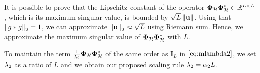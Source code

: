    It is possible to prove that the Lipschitz constant of the operator $\bm{\Phi}_\mathcal{H}\bm{\Phi}_\mathcal{H}^* \in \mathbb{R}^{L \times L}$, which is its maximum singular value, is bounded by $\sqrt{L} \left\lVert\mathbf{u}\right\rVert$. Using that $\left\lVert g*g\right\rVert_2 = 1$, we can approximate $\left\lVert\mathbf{u}\right\rVert_2 \approx \sqrt{L}$ using Riemann sum. Hence, we approximate the maximum singular value of $\bm{\Phi}_\mathcal{H}\bm{\Phi}_\mathcal{H}^*$ with $L$.

    To maintain the term $\frac{1}{\lambda_{2}} \bm{\Phi}_\mathcal{H}\bm{\Phi}_\mathcal{H}^*$ of the same order as $\mathbf{I}_L$ in $\eqref{eq:mlambda2}$, we set $\lambda_{2}$ as a ratio of $L$ and we obtain our proposed scaling rule $\lambda_{2} = \alpha_2 L$.
    




        
        



